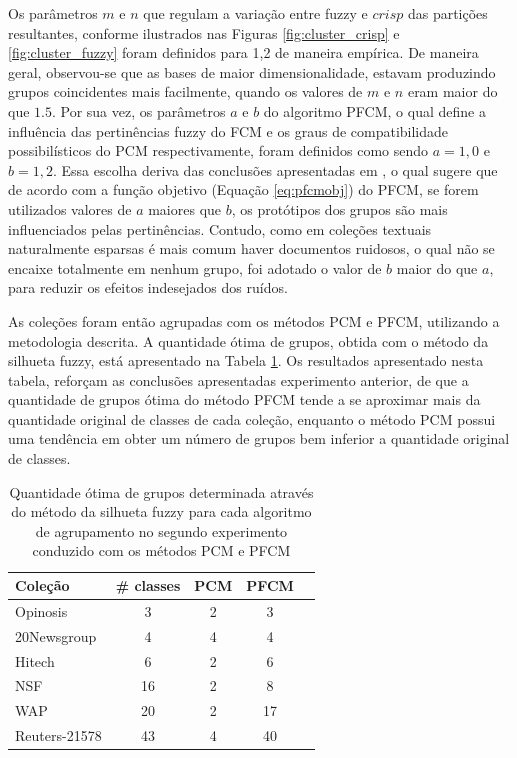 Os parâmetros $m$ e $n$ que regulam a variação entre fuzzy e $crisp$ das partições resultantes,
conforme ilustrados nas Figuras \ref{fig:cluster_crisp} e \ref{fig:cluster_fuzzy} foram definidos
para 1,2 de maneira empírica. De maneira geral, observou-se que as bases de maior dimensionalidade,
estavam produzindo grupos coincidentes mais facilmente, quando os valores de $m$ e $n$ eram maior do
que $1.5$. Por sua vez, os parâmetros $a$ e $b$ do algoritmo PFCM, o qual define a influência das
pertinências fuzzy do FCM e os graus de compatibilidade possibilísticos do PCM respectivamente,
foram definidos como sendo $a = 1,0$ e $b = 1,2$. Essa escolha deriva das conclusões apresentadas
em , o qual sugere que de acordo com a função objetivo (Equação
\ref{eq:pfcmobj}) do PFCM, se forem utilizados valores de $a$ maiores que $b$, os protótipos dos grupos
são mais influenciados pelas pertinências. Contudo, como em coleções textuais 
naturalmente esparsas é mais comum haver documentos ruidosos, o qual não se encaixe totalmente em
nenhum grupo, foi adotado o valor de $b$ maior do que $a$, para reduzir os efeitos
indesejados dos ruídos.

As coleções foram então agrupadas com os métodos PCM e PFCM, utilizando a metodologia descrita. A
quantidade ótima de grupos, obtida com o método da silhueta fuzzy, está apresentado na Tabela
\ref{table:pfcmclusters}. Os resultados apresentado nesta tabela, reforçam as conclusões
apresentadas experimento anterior, de que a quantidade de grupos ótima do método PFCM tende a se
aproximar mais da quantidade original de classes de cada coleção, enquanto o método PCM possui uma
tendência em obter um número de grupos bem inferior a quantidade original de classes.

\begin{table}[!htp]
  \centering
  \begin{tabular}{ |l|c|c|c|c|}
    \hline
    {\bf Coleção} & {\bf \# classes} & {\bf PCM} & {\bf PFCM} \\
    \hline
    Opinosis & 3 & 2 & 3 \\
    \hline
    20Newsgroup & 4 & 4 & 4 \\
    \hline
    Hitech & 6 & 2 & 6 \\
    \hline
    NSF & 16 &  2 & 8 \\
    \hline
    WAP & 20 & 2 & 17 \\
    \hline
    Reuters-21578 & 43 & 4 & 40 \\
    \hline
  \end{tabular}
  \caption{Quantidade ótima de grupos determinada através do método da silhueta fuzzy para cada
  algoritmo de agrupamento no segundo experimento conduzido com os métodos PCM e PFCM}
  \label{table:pfcmclusters}
\end{table}

